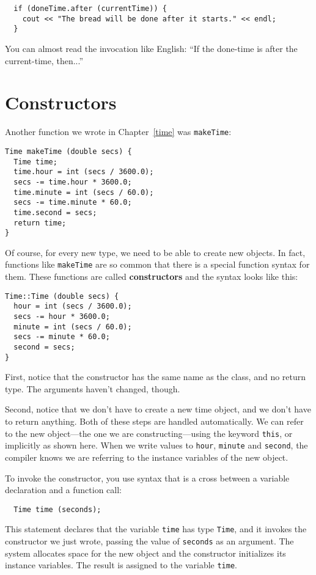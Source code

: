 \begin{verbatim}
  if (doneTime.after (currentTime)) {
    cout << "The bread will be done after it starts." << endl;
  }
\end{verbatim}
%
You can almost read the invocation like English: ``If the
done-time is after the current-time, then...''

\section{Constructors}

Another function we wrote in Chapter~\ref{time} was
{\tt makeTime}:

\begin{verbatim}
Time makeTime (double secs) {
  Time time;
  time.hour = int (secs / 3600.0);
  secs -= time.hour * 3600.0;
  time.minute = int (secs / 60.0);
  secs -= time.minute * 60.0;
  time.second = secs;
  return time;
}
\end{verbatim}
%
Of course, for every new type, we need to be able to create
new objects.  In fact, functions like {\tt makeTime} are so
common that there is a special function syntax for them.  These
functions are called {\bf constructors} and the syntax looks
like this:

\begin{verbatim}
Time::Time (double secs) {
  hour = int (secs / 3600.0);
  secs -= hour * 3600.0;
  minute = int (secs / 60.0);
  secs -= minute * 60.0;
  second = secs;
}
\end{verbatim}
%
First, notice that the constructor has the same name as the
class, and no return type.  The arguments haven't changed, though.

Second, notice that we don't have to create a new time object,
and we don't have to return anything.  Both of these steps are
handled automatically.  We can refer to the new object---the one
we are constructing---using the keyword {\tt this}, or implicitly
as shown here.  When we write values to {\tt hour}, {\tt minute}
and {\tt second}, the compiler knows we are referring to the instance
variables of the new object.

To invoke the constructor, you use syntax that is a cross
between a variable declaration and a function call:

\begin{verbatim}
  Time time (seconds);
\end{verbatim}
%
This statement declares that the variable {\tt time} has
type {\tt Time}, and it invokes the constructor we just wrote,
passing the value of {\tt seconds} as an argument.  The system
allocates space for the new object and the constructor initializes
its instance variables.  The result is assigned to the variable
{\tt time}.


